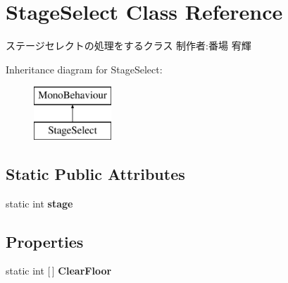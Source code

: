 \hypertarget{class_stage_select}{}\section{Stage\+Select Class Reference}
\label{class_stage_select}


ステージセレクトの処理をするクラス 制作者\+:番場 宥輝  


Inheritance diagram for Stage\+Select\+:\begin{figure}[H]
\begin{center}
\leavevmode
\includegraphics[height=2.000000cm]{class_stage_select}
\end{center}
\end{figure}
\subsection*{Static Public Attributes}
\begin{DoxyCompactItemize}
\item 
\mbox{\label{class_stage_select_aa69259adefd5b95d5c91d59478e97224}} 
static int {\bfseries stage}
\end{DoxyCompactItemize}
\subsection*{Properties}
\begin{DoxyCompactItemize}
\item 
\mbox{\label{class_stage_select_a390abc742a0bdf5e053dfa652d3e2d66}} 
static int \mbox{[}$\,$\mbox{]} {\bfseries Clear\+Floor}
\end{DoxyCompactItemize}
